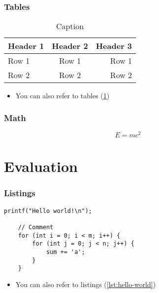\documentclass[
	aspectratio=169,
	compress,
]{beamer}
\newcommand{\navframetitle}[1]{\frametitle{#1\hfill{\footnotesize\lastsection{}}}}
\begin{document}
\begin{frame}
	\navframetitle{Tables}

	\begin{table}[ht]
		\centering
		\begin{tabular}{|l|c|r|}
			\hline
			\textbf{Header 1} & \textbf{Header 2} & \textbf{Header 3} \\
			\hline
			\hline
			Row 1 & Row 1 & Row 1 \\
			Row 2 & Row 2 & Row 2 \\
			\hline
		\end{tabular}
		\caption{Caption}
		\label{tab:table}
	\end{table}

	\begin{itemize}
		\item You can also refer to tables (\cref{tab:table})
	\end{itemize}
\end{frame}

\begin{frame}
	\navframetitle{Math}

	\[
		E = m c^2
	\]
\end{frame}

\section{Evaluation}
\label{sec:evaluation}

\begin{frame}[fragile]
	\navframetitle{Listings}

	\begin{lstlisting}[caption=Caption,label=lst:hello-world]
	printf("Hello world!\n");

	// Comment
	for (int i = 0; i < m; i++) {
		for (int j = 0; j < n; j++) {
			sum += 'a';
		}
	}
	\end{lstlisting}

	\begin{itemize}
		\item You can also refer to listings (\cref{lst:hello-world})
	\end{itemize}
\end{frame}
\end{document}

